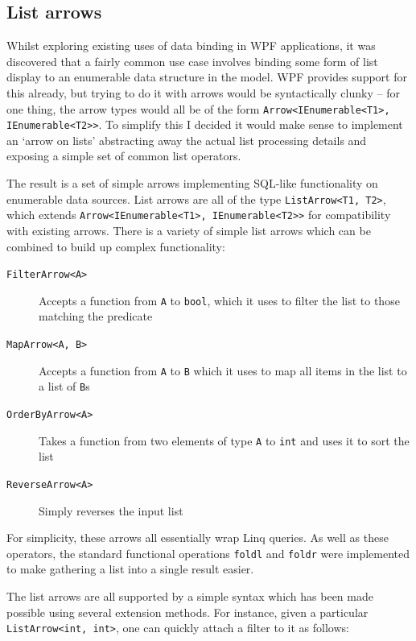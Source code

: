 \documentclass[12pt,twoside,notitlepage]{report}
\begin{document}
\subsection{List arrows}

Whilst exploring existing uses of data binding in WPF applications, it was discovered that a fairly common use case involves binding some form of list display to an enumerable data structure in the model. WPF provides support for this already, but trying to do it with arrows would be syntactically clunky -- for one thing, the arrow types would all be of the form \texttt{Arrow<IEnumerable<T1>, IEnumerable<T2>>}. To simplify this I decided it would make sense to implement an `arrow on lists' abstracting away the actual list processing details and exposing a simple set of common list operators.

The result is a set of simple arrows implementing SQL-like functionality on enumerable data sources. List arrows are all of the type \texttt{ListArrow<T1, T2>}, which extends \texttt{Arrow<IEnumerable<T1>, IEnumerable<T2>>} for compatibility with existing arrows. There is a variety of simple list arrows which can be combined to build up complex functionality:

\begin{description}
	\item[\texttt{FilterArrow<A>}] Accepts a function from \texttt{A} to \texttt{bool}, which it uses to filter the list to those matching the predicate
	\item[\texttt{MapArrow<A, B>}] Accepts a function from \texttt{A} to \texttt{B} which it uses to map all items in the list to a list of \texttt{B}s
	\item[\texttt{OrderByArrow<A>}] Takes a function from two elements of type \texttt{A} to \texttt{int} and uses it to sort the list
	\item[\texttt{ReverseArrow<A>}] Simply reverses the input list
\end{description}

For simplicity, these arrows all essentially wrap Linq queries. As well as these operators, the standard functional operations \texttt{foldl} and \texttt{foldr} were implemented to make gathering a list into a single result easier.

The list arrows are all supported by a simple syntax which has been made possible using several extension methods. For instance, given a particular \texttt{ListArrow<int, int>}, one can quickly attach a filter to it as follows:
\end{document}
